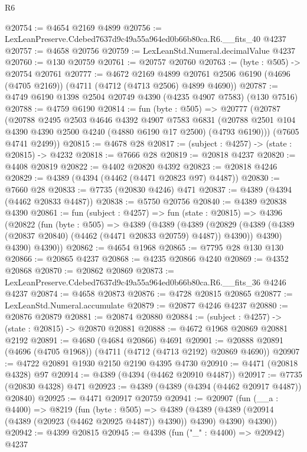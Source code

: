 \begin{lexlean}{R6}
\begin{coremodule}
@20754 := @4654 @2169 @4899
@20756 := LexLeanPreserve.Cdebed7637d9c49a55a964ed0b66b80ca.R6.__fits_40 @4237
@20757 := @4658 @20756
@20759 := LexLeanStd.Numeral.decimalValue @4237
@20760 := @130 @20759
@20761 := @20757 @20760
@20763 := (byte : @505) -> @20754 @20761
@20777 := @4672
    @2169
    @4899
    @20761
    @2506
    @6190
    (@4696 (@4705 @2169))
    (@4711 (@4712 (@4713 @2506) @4899 @4690))
@20787 := @4749 @6190 @1398 @2504 @20749 @4390 (@4235 @4907 @7583) (@130 @7516)
@20788 := @4759 @6190
@20814 := fun (byte : @505) =>
  @20777
    (@20787
      (@20788
        @2495
        @2503
        @4646
        @4392
        @4907
        @7583
        @6831
        (@20788 @2501 @104 @4390 @4390 @2500 @4240 (@4880 @6190 @17 @2500) (@4793 @6190)))
      (@7605 @4741 @2499))
@20815 := @4678 @28
@20817 := (subject : @4257) -> (state : @20815) -> @4232
@20818 := @7666 @28
@20819 := @20818 @4237
@20820 := @4408 @20819
@20822 := @4402 @20820 @4392
@20823 := @20818 @4246
@20829 := @4389 (@4394 (@4462 (@4471 @20823 @97) @4487))
@20830 := @7660 @28
@20833 := @7735 (@20830 @4246) @471
@20837 := @4389 (@4394 (@4462 @20833 @4487))
@20838 := @5750 @20756
@20840 := @4389 @20838 @4390
@20861 := fun (subject : @4257) =>
  fun (state : @20815) =>
  @4396
    (@20822
      (fun (byte : @505) =>
      @4389
        (@4389
          (@4389
            (@20829 (@4389 (@4389 (@20837 @20840) (@4462 (@4471 @20833 @20759) @4487)) @4390))
            @4390)
          @4390)
        @4390))
@20862 := @4654 @1968
@20865 := @7795 @28 @130 @130
@20866 := @20865 @4237
@20868 := @4235 @20866 @4240
@20869 := @4352 @20868
@20870 := @20862 @20869
@20873 := LexLeanPreserve.Cdebed7637d9c49a55a964ed0b66b80ca.R6.__fits_36 @4246 @4237
@20874 := @4658 @20873
@20876 := @4728 @20815 @20865
@20877 := LexLeanStd.Numeral.accumulate
@20879 := @20877 @4246 @4237
@20880 := @20876 @20879
@20881 := @20874 @20880
@20884 := (subject : @4257) -> (state : @20815) -> @20870 @20881
@20888 := @4672 @1968 @20869 @20881 @2192
@20891 := @4680 (@4684 @20866) @4691
@20901 := @20888 @20891 (@4696 (@4705 @1968)) (@4711 (@4712 (@4713 @2192) @20869 @4690))
@20907 := @4722 @20891 @1930 @2150 @2190 @4395 @4730
@20910 := @4471 (@20818 @4328) @97
@20914 := @4389 (@4394 (@4462 @20910 @4487))
@20917 := @7735 (@20830 @4328) @471
@20923 := @4389 (@4389 (@4394 (@4462 @20917 @4487)) @20840)
@20925 := @4471 @20917 @20759
@20941 := @20907
    (fun (__a : @4400) =>
    @8219
      (fun (byte : @505) =>
      @4389 (@4389 (@4389 (@20914 (@4389 (@20923 (@4462 @20925 @4487)) @4390)) @4390) @4390) @4390))
@20942 := @4399 @20815
@20945 := @4398 (fun ("_" : @4400) => @20942) @4237

\end{coremodule}
\end{lexlean}
